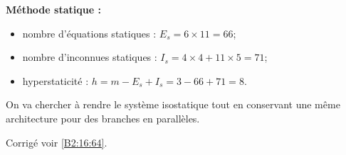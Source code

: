 \textbf{Méthode statique : }
\begin{itemize}
\item nombre d'équations statiques : $E_s = 6\times 11 = 66$;
\item nombre d'inconnues statiques : $I_s = 4 \times 4+ 11 \times 5 = 71$;
\item hyperstaticité : $h=m-E_s + I_s = 3 -66 + 71 = 8$.
\end{itemize}


\else 
\fi

\ifprof
On va chercher à rendre le système isostatique tout en conservant une même architecture pour des branches en parallèles.
%

\else 
\fi
 
 

\ifprof
\else
\ifcolle
\else
\noindent\footnotesize
\normalsize
\fi

\begin{flushright}
\footnotesize{Corrigé  voir \ref{B2:16:64}.}
\end{flushright}%
\fi